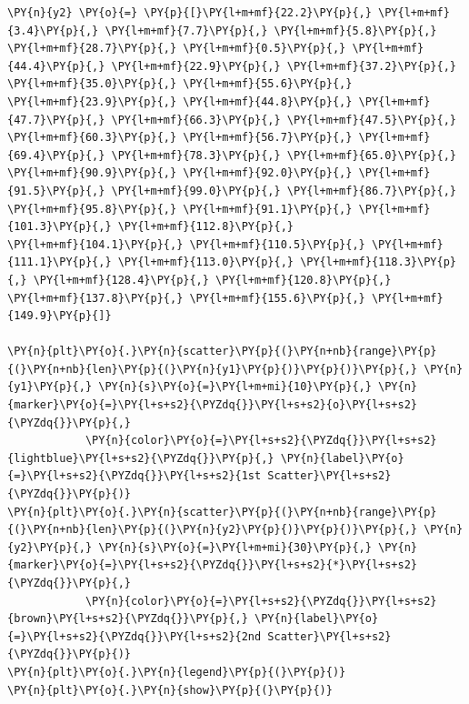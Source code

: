 \begin{tcolorbox}[breakable, size=fbox, boxrule=1pt, pad at break*=1mm,colback=cellbackground, colframe=cellborder]
\begin{Verbatim}[commandchars=\\\{\}]
\PY{n}{y2} \PY{o}{=} \PY{p}{[}\PY{l+m+mf}{22.2}\PY{p}{,} \PY{l+m+mf}{3.4}\PY{p}{,} \PY{l+m+mf}{7.7}\PY{p}{,} \PY{l+m+mf}{5.8}\PY{p}{,} \PY{l+m+mf}{28.7}\PY{p}{,} \PY{l+m+mf}{0.5}\PY{p}{,} \PY{l+m+mf}{44.4}\PY{p}{,} \PY{l+m+mf}{22.9}\PY{p}{,} \PY{l+m+mf}{37.2}\PY{p}{,} \PY{l+m+mf}{35.0}\PY{p}{,} \PY{l+m+mf}{55.6}\PY{p}{,} 
\PY{l+m+mf}{23.9}\PY{p}{,} \PY{l+m+mf}{44.8}\PY{p}{,} \PY{l+m+mf}{47.7}\PY{p}{,} \PY{l+m+mf}{66.3}\PY{p}{,} \PY{l+m+mf}{47.5}\PY{p}{,} \PY{l+m+mf}{60.3}\PY{p}{,} \PY{l+m+mf}{56.7}\PY{p}{,} \PY{l+m+mf}{69.4}\PY{p}{,} \PY{l+m+mf}{78.3}\PY{p}{,} \PY{l+m+mf}{65.0}\PY{p}{,} 
\PY{l+m+mf}{90.9}\PY{p}{,} \PY{l+m+mf}{92.0}\PY{p}{,} \PY{l+m+mf}{91.5}\PY{p}{,} \PY{l+m+mf}{99.0}\PY{p}{,} \PY{l+m+mf}{86.7}\PY{p}{,} \PY{l+m+mf}{95.8}\PY{p}{,} \PY{l+m+mf}{91.1}\PY{p}{,} \PY{l+m+mf}{101.3}\PY{p}{,} \PY{l+m+mf}{112.8}\PY{p}{,} 
\PY{l+m+mf}{104.1}\PY{p}{,} \PY{l+m+mf}{110.5}\PY{p}{,} \PY{l+m+mf}{111.1}\PY{p}{,} \PY{l+m+mf}{113.0}\PY{p}{,} \PY{l+m+mf}{118.3}\PY{p}{,} \PY{l+m+mf}{128.4}\PY{p}{,} \PY{l+m+mf}{120.8}\PY{p}{,} \PY{l+m+mf}{137.8}\PY{p}{,} \PY{l+m+mf}{155.6}\PY{p}{,} \PY{l+m+mf}{149.9}\PY{p}{]}
	
\PY{n}{plt}\PY{o}{.}\PY{n}{scatter}\PY{p}{(}\PY{n+nb}{range}\PY{p}{(}\PY{n+nb}{len}\PY{p}{(}\PY{n}{y1}\PY{p}{)}\PY{p}{)}\PY{p}{,} \PY{n}{y1}\PY{p}{,} \PY{n}{s}\PY{o}{=}\PY{l+m+mi}{10}\PY{p}{,} \PY{n}{marker}\PY{o}{=}\PY{l+s+s2}{\PYZdq{}}\PY{l+s+s2}{o}\PY{l+s+s2}{\PYZdq{}}\PY{p}{,} 
            \PY{n}{color}\PY{o}{=}\PY{l+s+s2}{\PYZdq{}}\PY{l+s+s2}{lightblue}\PY{l+s+s2}{\PYZdq{}}\PY{p}{,} \PY{n}{label}\PY{o}{=}\PY{l+s+s2}{\PYZdq{}}\PY{l+s+s2}{1st Scatter}\PY{l+s+s2}{\PYZdq{}}\PY{p}{)}
\PY{n}{plt}\PY{o}{.}\PY{n}{scatter}\PY{p}{(}\PY{n+nb}{range}\PY{p}{(}\PY{n+nb}{len}\PY{p}{(}\PY{n}{y2}\PY{p}{)}\PY{p}{)}\PY{p}{,} \PY{n}{y2}\PY{p}{,} \PY{n}{s}\PY{o}{=}\PY{l+m+mi}{30}\PY{p}{,} \PY{n}{marker}\PY{o}{=}\PY{l+s+s2}{\PYZdq{}}\PY{l+s+s2}{*}\PY{l+s+s2}{\PYZdq{}}\PY{p}{,} 
            \PY{n}{color}\PY{o}{=}\PY{l+s+s2}{\PYZdq{}}\PY{l+s+s2}{brown}\PY{l+s+s2}{\PYZdq{}}\PY{p}{,} \PY{n}{label}\PY{o}{=}\PY{l+s+s2}{\PYZdq{}}\PY{l+s+s2}{2nd Scatter}\PY{l+s+s2}{\PYZdq{}}\PY{p}{)}
\PY{n}{plt}\PY{o}{.}\PY{n}{legend}\PY{p}{(}\PY{p}{)}
\PY{n}{plt}\PY{o}{.}\PY{n}{show}\PY{p}{(}\PY{p}{)}
\end{Verbatim}
\end{tcolorbox}

